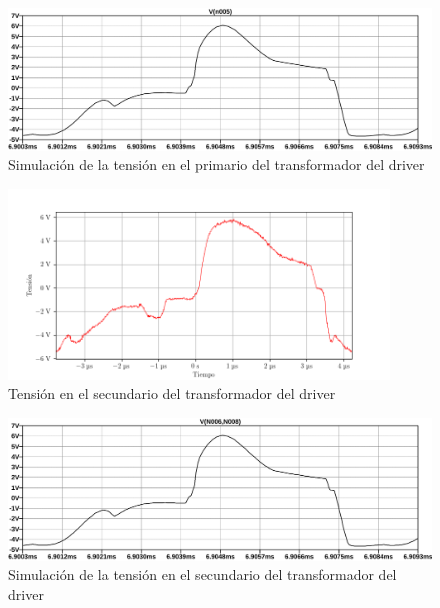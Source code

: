 \begin{figure}[H]
    \centering
    \includegraphics[width=\textwidth]{images/sim/4.pdf}
    \caption{Simulación de la tensión en el primario del transformador del driver}
    \label{fig:sim:4}
\end{figure}

\begin{figure}[H]
    \centering
    \includegraphics[width=0.9\textwidth]{images/capturas-osciloscopio/17-11-2022/9.png}
    \caption{Tensión en el secundario del transformador del driver}
    \label{fig:osc:9}
\end{figure}

\begin{figure}[H]
    \centering
    \includegraphics[width=\textwidth]{images/sim/5.pdf}
    \caption{Simulación de la tensión en el secundario del transformador del driver}
    \label{fig:sim:5}
\end{figure}


